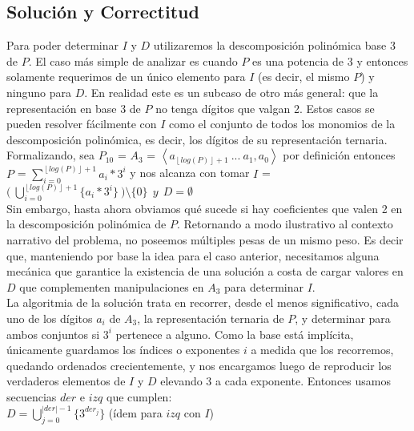 \subsection{Solución y Correctitud}
	Para poder determinar $I$ y $D$ utilizaremos la descomposición polinómica base 3 de $P$. El caso más simple de analizar es cuando $P$ es una potencia de 3 y entonces solamente requerimos de un único elemento para $I$ (es decir, el mismo $P$) y ninguno para $D$. En realidad este es un subcaso de otro más general: que la representación en base 3 de $P$ no tenga dígitos que valgan 2. Estos casos se pueden resolver fácilmente con $I$ como el conjunto de todos los monomios de la descomposición polinómica, es decir, los dígitos de su representación ternaria. Formalizando, sea $P_{10}$ = $A_3$ = $\left \langle a_{ \left \lfloor{log(P)}\right \rfloor + 1 } \ ... \ a_1, a_0  \right \rangle$ por definición entonces \\

	$P$ = $\sum_{i = 0}^{\left \lfloor{log(P)}\right \rfloor + 1} a_i*3^{i}$ y nos alcanza con tomar $I$ = $\bigl ( \ \bigcup_{i=0}^{\left \lfloor{log(P)}\right \rfloor + 1} \{a_i*3^{i}\} \ \bigr ) \setminus \{0\} \ \ y \ \ D = \emptyset $
	\\

	Sin embargo, hasta ahora obviamos qué sucede si hay coeficientes que valen 2 en la descomposición polinómica de $P$. Retornando a modo ilustrativo al contexto narrativo del problema, no poseemos múltiples pesas de un mismo peso. Es decir que, manteniendo por base la idea para el caso anterior, necesitamos alguna mecánica que garantice la existencia de una solución a costa de cargar valores en $D$ que complementen manipulaciones en $A_3$ para determinar $I$.
	\\

	La algoritmia de la solución trata en recorrer, desde el menos significativo, cada uno de los dígitos $a_i$ de $A_3$, la representación ternaria de $P$, y determinar para ambos conjuntos si $3^{i}$ pertenece a alguno. Como la base está implícita, únicamente guardamos los índices o exponentes $i$ a medida que los recorremos, quedando ordenados crecientemente, y nos encargamos luego de reproducir los verdaderos elementos de $I$ y $D$ elevando 3 a cada exponente. Entonces usamos secuencias $der$ e $izq$ que cumplen:
	\\

	$D = \bigcup_{j=0}^{|der|-1} \{3^{der_{j}}\}  $   \quad (ídem para $izq$ con $I$)
	\\

